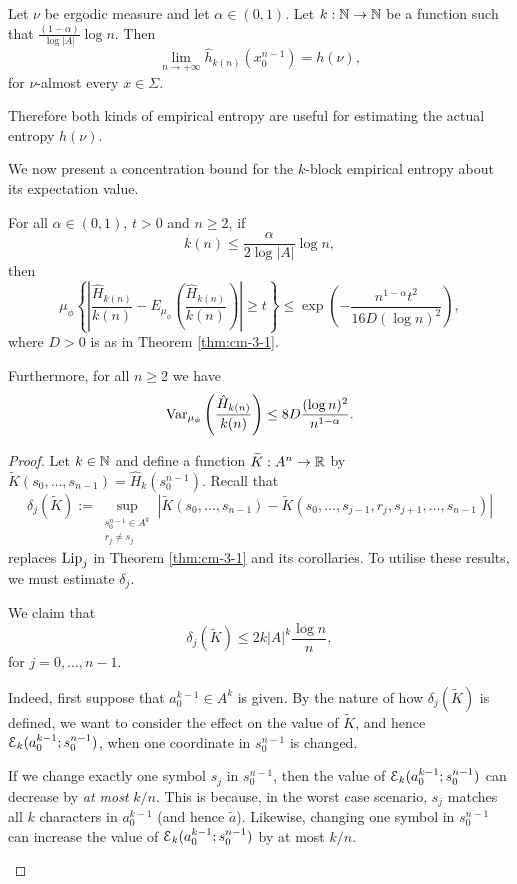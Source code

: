 \begin{theorem}
	 Let $\nu$ be ergodic measure and let $\alpha \in (0, 1)$. Let $k : \mathbb{N} \to \mathbb{N}$ be a function such that $\frac{(1 - \alpha)}{\log{|A|}}\log{n}$. Then
	 \[
	 	\lim_{n \to +\infty}{\hat{h}_{k(n)}(x_0^{n - 1})} = h(\nu),
	 \]
	 for $\nu$-almost every $x \in \Sigma$.
\end{theorem}

Therefore both kinds of empirical entropy are useful for estimating the actual entropy $h(\nu)$.

We now present a concentration bound for the $k$-block empirical entropy about its expectation value.

\begin{theorem}\label{thm:cm-4-1}
	For all $\alpha \in (0, 1)$, $t > 0$ and $n \geq 2$, if
	\[
		k(n) \leq \frac{\alpha}{2 \log{|A|}}\log{n},
	\]
	then
	\[
		\mu_\phi\left\{\left|\frac{\hat{H}_{k(n)}}{k(n)} - E_{\mu_\phi}\left(\frac{\hat{H}_{k(n)}}{k(n)}\right)\right| \geq t\right\} \leq \exp\left(-\frac{n^{1 - \alpha} t^2}{16D(\log{n})^2}\right),
	\]
	where $D > 0$ is as in Theorem \ref{thm:cm-3-1}.
	
	Furthermore, for all $n \geq 2$ we have
	\[
		\operatorname{Var}_{\mu_\phi}\left(\frac{\hat{H}_{k(n)}}{k(n)}\right) \leq 8D\frac{(\log{n})^2}{n^{1 - \alpha}}.
	\]
	\begin{proof}
		Let $k \in \mathbb{N}$ and define a function $\widetilde{K} : A^n \to \mathbb{R}$ by $\tilde{K}(s_0, \dots, s_{n - 1}) = \hat{H}_k(s_0^{n - 1})$. Recall that
		\[
			\delta_j(\tilde{K}) := \sup_{\substack{s_0^{n - 1} \in A^k \\ r_j \neq s_j}}{|\tilde{K}(s_0, \dots, s_{n - 1}) - \tilde{K}(s_0, \dots, s_{j - 1}, r_j, s_{j + 1}, \dots, s_{n - 1})|}
		\]
		replaces $\operatorname{Lip}_j$ in Theorem \ref{thm:cm-3-1} and its corollaries. To utilise these results, we must estimate $\delta_j$.
		\begin{claim}
			We claim that
			\begin{equation}
				\delta_j(\tilde{K}) \leq 2k|A|^k\frac{\log{n}}{n}, \label{fml:oscil-est}
			\end{equation}
			for $j = 0, \dots, n - 1$.
			
			Indeed, first suppose that $a_0^{k - 1} \in A^k$ is given. By the nature of how $\delta_j(\tilde{K})$ is defined, we want to consider the effect on the value of $\tilde{K}$, and hence $\mathcal{E}_k(a_0^{k - 1};s_0^{n - 1})$, when one coordinate in $s_0^{n - 1}$ is changed.
			
			If we change exactly one symbol $s_j$ in $s_0^{n - 1}$, then the value of $\mathcal{E}_k(a_0^{k - 1}; s_0^{n - 1})$ can decrease by \emph{at most} $k / n$. This is because, in the worst case scenario, $s_j$ matches all $k$ characters in $a_0^{k - 1}$ (and hence $\tilde{a}$). Likewise, changing one symbol in $s_0^{n - 1}$ can increase the value of $\mathcal{E}_k(a_0^{k - 1}; s_0^{n - 1})$ by at most $k / n$.
			

\end{claim}
\end{proof}
\end{theorem}
